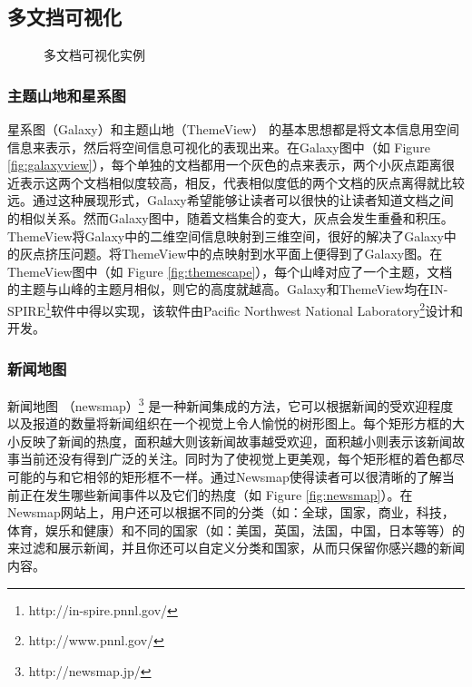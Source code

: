 \subsection{多文挡可视化}
\begin{figure}[htb]
	\centering
	\caption{多文档可视化实例}
	\label{fig:multi-doc-visual}
\end{figure}
\subsubsection{主题山地和星系图}
星系图（Galaxy）和主题山地（ThemeView）\cite{Wise1995} 的基本思想都是将文本信息用空间信息来表示，然后将空间信息可视化的表现出来。在Galaxy图中（如 Figure \ref{fig:galaxyview}），每个单独的文档都用一个灰色的点来表示，两个小灰点距离很近表示这两个文档相似度较高，相反，代表相似度低的两个文档的灰点离得就比较远。通过这种展现形式，Galaxy希望能够让读者可以很快的让读者知道文档之间的相似关系。然而Galaxy图中，随着文档集合的变大，灰点会发生重叠和积压。ThemeView将Galaxy中的二维空间信息映射到三维空间，很好的解决了Galaxy中的灰点挤压问题。将ThemeView中的点映射到水平面上便得到了Galaxy图。在ThemeView图中（如 Figure \ref{fig:themescape}），每个山峰对应了一个主题，文档的主题与山峰的主题月相似，则它的高度就越高。Galaxy和ThemeView均在IN-SPIRE\footnote{http://in-spire.pnnl.gov/}软件中得以实现，该软件由Pacific Northwest National Laboratory\footnote{http://www.pnnl.gov/}设计和开发。

\subsubsection{新闻地图}
新闻地图 （newsmap）\footnote{http://newsmap.jp/} 是一种新闻集成的方法，它可以根据新闻的受欢迎程度以及报道的数量将新闻组织在一个视觉上令人愉悦的树形图上。每个矩形方框的大小反映了新闻的热度，面积越大则该新闻故事越受欢迎，面积越小则表示该新闻故事当前还没有得到广泛的关注。同时为了使视觉上更美观，每个矩形框的着色都尽可能的与和它相邻的矩形框不一样。通过Newsmap使得读者可以很清晰的了解当前正在发生哪些新闻事件以及它们的热度（如 Figure \ref{fig:newsmap}）。在Newsmap网站上，用户还可以根据不同的分类（如：全球，国家，商业，科技，体育，娱乐和健康）和不同的国家（如：美国，英国，法国，中国，日本等等）的来过滤和展示新闻，并且你还可以自定义分类和国家，从而只保留你感兴趣的新闻内容。


